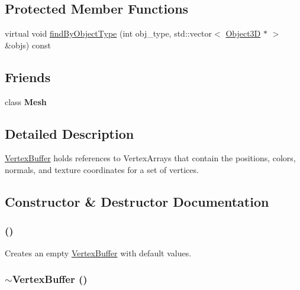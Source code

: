 \subsection*{Protected Member Functions}
\begin{CompactItemize}
\item 
virtual void \hyperlink{classm3g_1_1VertexBuffer_4dadb21b568b0230fac106f15040138c}{findByObjectType} (int obj\_\-type, std::vector$<$ \hyperlink{classm3g_1_1Object3D}{Object3D} $\ast$ $>$ \&objs) const 
\end{CompactItemize}
\subsection*{Friends}
\begin{CompactItemize}
\item 
\hypertarget{classm3g_1_1VertexBuffer_a41a130f156b145bffb3f4b5172c4c93}{
class \textbf{Mesh}}
\label{classm3g_1_1VertexBuffer_a41a130f156b145bffb3f4b5172c4c93}

\end{CompactItemize}


\subsection{Detailed Description}
\hyperlink{classm3g_1_1VertexBuffer}{VertexBuffer} holds references to VertexArrays that contain the positions, colors, normals, and texture coordinates for a set of vertices. 

\subsection{Constructor \& Destructor Documentation}
\hypertarget{classm3g_1_1VertexBuffer_fd7b13840c99c57d27316c8f8434dc49}{
\subsubsection[{VertexBuffer}]{ ()}}
\label{classm3g_1_1VertexBuffer_fd7b13840c99c57d27316c8f8434dc49}


Creates an empty \hyperlink{classm3g_1_1VertexBuffer}{VertexBuffer} with default values. \hypertarget{classm3g_1_1VertexBuffer_0e5e1dbdc4295ff9aa1e15e0ce3624af}{
\subsubsection[{$\sim$VertexBuffer}]{\setlength{\rightskip}{0pt plus 5cm}$\sim${\bf VertexBuffer} ()}}
\label{classm3g_1_1VertexBuffer_0e5e1dbdc4295ff9aa1e15e0ce3624af}


